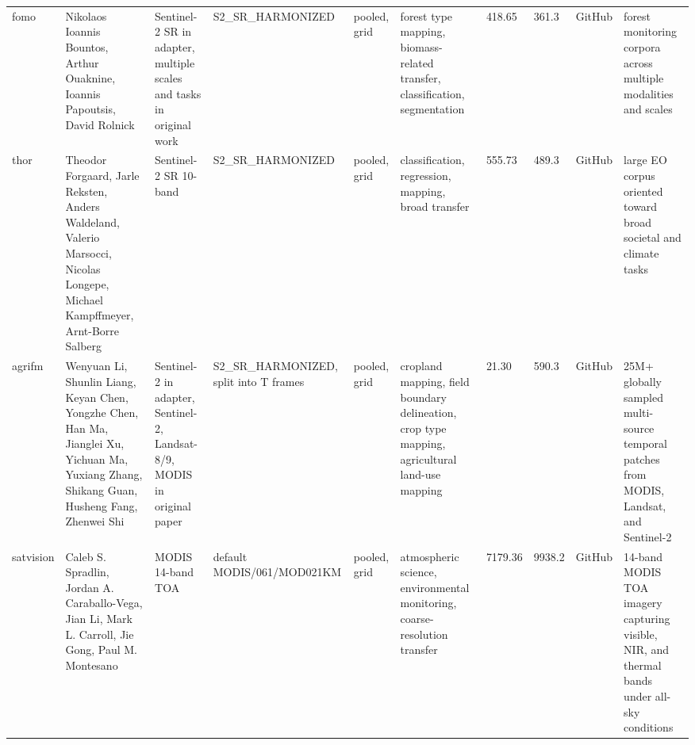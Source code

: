 \begin{landscape}
\begin{longtable}{p{1.35cm}p{2.9cm}p{2.25cm}p{1.95cm}p{1.65cm}p{2.3cm}p{1.45cm}p{1.35cm}p{2.7cm}p{1.95cm}}
fomo & Nikolaos Ioannis Bountos, Arthur Ouaknine, Ioannis Papoutsis, David Rolnick & Sentinel-2 SR in adapter, multiple scales and tasks in original work & S2\_SR\_HARMONIZED & pooled, grid & forest type mapping, biomass-related transfer, classification, segmentation & 418.65 & 361.3 & GitHub & forest monitoring corpora across multiple modalities and scales \\
thor & Theodor Forgaard, Jarle Reksten, Anders Waldeland, Valerio Marsocci, Nicolas Longepe, Michael Kampffmeyer, Arnt-Borre Salberg & Sentinel-2 SR 10-band & S2\_SR\_HARMONIZED & pooled, grid & classification, regression, mapping, broad transfer & 555.73 & 489.3 & GitHub & large EO corpus oriented toward broad societal and climate tasks \\
agrifm & Wenyuan Li, Shunlin Liang, Keyan Chen, Yongzhe Chen, Han Ma, Jianglei Xu, Yichuan Ma, Yuxiang Zhang, Shikang Guan, Husheng Fang, Zhenwei Shi & Sentinel-2 in adapter, Sentinel-2, Landsat-8/9, MODIS in original paper & S2\_SR\_HARMONIZED, split into T frames & pooled, grid & cropland mapping, field boundary delineation, crop type mapping, agricultural land-use mapping & 21.30 & 590.3 & GitHub & 25M+ globally sampled multi-source temporal patches from MODIS, Landsat, and Sentinel-2 \\
satvision & Caleb S. Spradlin, Jordan A. Caraballo-Vega, Jian Li, Mark L. Carroll, Jie Gong, Paul M. Montesano & MODIS 14-band TOA & default MODIS/061/MOD021KM & pooled, grid & atmospheric science, environmental monitoring, coarse-resolution transfer & 7179.36 & 9938.2 & GitHub & 14-band MODIS TOA imagery capturing visible, NIR, and thermal bands under all-sky conditions \\
\end{longtable}
\normalsize
\end{landscape}
